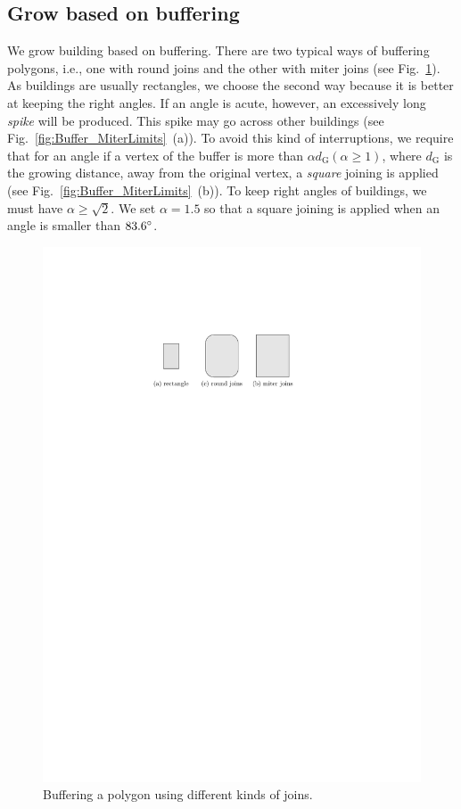 \documentclass[graybox]{svmult}
\newcommand{\fig}{Fig.~}
\begin{document}
\subsection{Grow based on buffering}
\label{sec:Grow}
We grow building based on buffering. 
There are two typical ways of buffering polygons, i.e.,
one with round joins and the other with miter joins (see 
\fig\ref{fig:Buffer_TwoKinds}).
As buildings are usually rectangles, 
we choose the second way because it is 
better at keeping the right angles.
If an angle is acute, however, an excessively long \emph{spike} will be 
produced.
This spike may go across other buildings 
(see \fig\ref{fig:Buffer_MiterLimits}~(a)).
To avoid this kind of interruptions, 
we require that for an angle if a vertex of the 
buffer is more than $\alpha d_\mathrm{G} (\alpha \ge 1)$, 
where $d_\mathrm{G}$ is the growing distance, 
away from the original vertex, 
a \emph{square} joining is applied
(see \fig\ref{fig:Buffer_MiterLimits}~(b)).
To keep right angles of buildings, 
we must have $\alpha \geq \sqrt{2}$. 
We set $\alpha  = 1.5$ so that a square joining is applied when an angle is 
smaller than $83.6 \degree$.

\begin{figure}[tb]
	\centering
	\includegraphics{Buffer_TwoKinds}
	\caption{Buffering a polygon using different kinds of joins.}
	\label{fig:Buffer_TwoKinds}
\end{figure}
\end{document}
